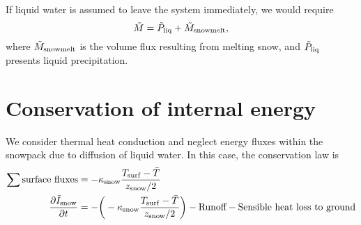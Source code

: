 \documentclass{article}
\begin{document}
If liquid water is assumed to leave the system immediately, we would require
\begin{equation}
    \tilde{M} = \tilde{P}_{\rm liq} + \tilde{M}_{\rm snowmelt},
\end{equation}
where $\tilde{M}_{\rm snowmelt}$ is the volume flux resulting from melting snow, and $\tilde{P}_{\rm liq}$ presents liquid precipitation.




\section{Conservation of internal energy}
We consider thermal heat conduction and neglect energy fluxes within the snowpack due to diffusion of liquid water. In this case, the conservation law is
\begin{align}
    \sum \text{surface fluxes} &= -\kappa_{\rm snow} \frac{T_{\rm surf}- \bar{T}}{z_{\rm snow}/2} \nonumber \\
        \frac{\partial \bar{I}_{\rm snow}}{\partial t} &= -\bigg(-\kappa_{\rm snow} \frac{T_{\rm surf}- \bar{T}}{z_{\rm snow}/2}\bigg) - \text{Runoff} - \text{Sensible heat loss to ground} \nonumber \\
\end{align}
\end{document}
